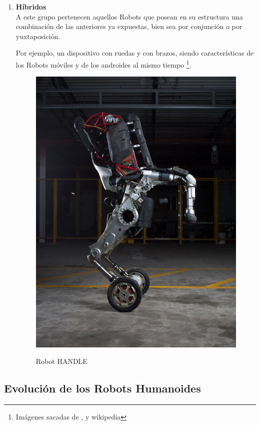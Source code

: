 \begin{enumerate}
\item \textbf{Híbridos}\\ A este grupo pertenecen aquellos Robots que posean en su estructura una combinación de las anteriores ya expuestas, bien sea por conjunción o por yuxtaposición. 

Por ejemplo, un dispositivo con ruedas y con brazos, siendo características de los Robots móviles y de los androides al mismo tiempo \footnote{Imágenes sacadas de \cite{ref36}, \cite{ref37} y wikipedia}.

\begin{figure}[H]
\centering
{\includegraphics[scale=0.15]{imagenes/apartado_2/25_hibrido_handle_bd}}
\caption{Robot HANDLE}
\label{figura25}
\end{figure}

\end{enumerate}

\newpage

\subsection{Evolución de los Robots Humanoides}\label{historia_robots_humanoides}

